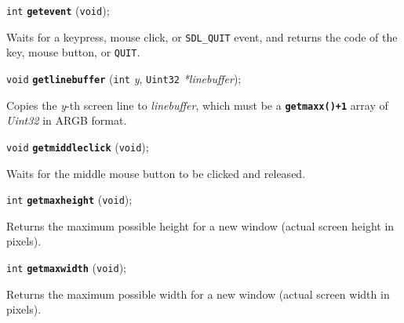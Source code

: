 \documentclass[a4paper,12pt]{article}
\newcommand{\V}{\texttt{void}}      %
\newcommand{\I}{\texttt{int}}       %
\newcommand{\Ut}{\texttt{Uint32}}   %
\newcommand{\func}[1]{\textbf{\texttt{#1}}}  %
\newcommand{\A}[1]{\emph{#1}}       %
\newcommand{\T}[1]{\texttt{#1}}     %
\newenvironment{bgi}
{ %
  \begin{snugshade}
}
{ %
  \end{snugshade}
}
\begin{document}

\label{sec:getevent}

\begin{bgi}
\I{} \func{getevent} (\V{});
\end{bgi}

Waits for a keypress, mouse click, or \T{SDL\_QUIT} event, and returns
the code of the key, mouse button, or \T{QUIT}.


\label{sec:getlinebuffer}

\begin{bgi}
\V{} \func{getlinebuffer} (\I{} \A{y}, \Ut{} \A{*linebuffer});
\end{bgi}

Copies the \A{y}-th screen line to \A{linebuffer}, which must be a
\func{getmaxx()+1} array of \A{Uint32} in ARGB format.


\label{sec:getmiddleclick}

\begin{bgi}
\V{} \func{getmiddleclick} (\V{});
\end{bgi}

Waits for the middle mouse button to be clicked and released.


\label{sec:getmaxheight}

\begin{bgi}
\I{} \func{getmaxheight} (\V{});
\end{bgi}

Returns the maximum possible height for a new window (actual screen
height in pixels).


\label{sec:getmaxwidth}

\begin{bgi}
\I{} \func{getmaxwidth} (\V{});
\end{bgi}

Returns the maximum possible width for a new window (actual screen
width in pixels).


\label{sec:getmouseclick}
\end{document}
